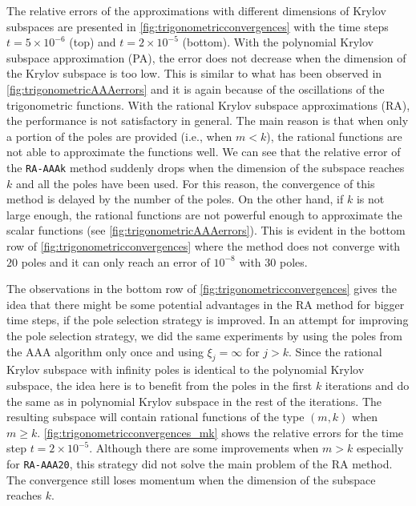 The relative errors of the approximations with different dimensions of Krylov subspaces
are presented in \autoref{fig:trigonometricconvergences} with the time steps
$t=5 \times 10^{-6}$ (top) and $t=2 \times 10^{-5}$ (bottom).
With the polynomial Krylov subspace approximation (PA), the error does not decrease when
the dimension of the Krylov subspace is too low. This is similar to what has been
observed in \autoref{fig:trigonometricAAAerrors} and it is again because of the
oscillations of the trigonometric functions.
With the rational Krylov subspace approximations (RA), the performance is not satisfactory in general.
The main reason is that when only a portion of the poles are provided (i.e., when $m < k$),
the rational functions are not able to approximate the functions well. We can see that
the relative error of the \texttt{RA-AAAk} method suddenly drops when the dimension of
the subspace reaches $k$ and all the poles have been used. For this reason, the convergence
of this method is delayed by the number of the poles. On the other hand, if $k$ is not large
enough, the rational functions are not powerful enough to approximate the scalar functions
(see \autoref{fig:trigonometricAAAerrors}).
This is evident in the bottom row of \autoref{fig:trigonometricconvergences} where the method
does not converge with $20$ poles and it can only reach an error of $10^{-8}$ with $30$ poles.

The observations in the bottom row of \autoref{fig:trigonometricconvergences} gives the
idea that there might be some potential advantages in the RA method for bigger time steps,
if the pole selection strategy is improved. In an attempt for improving the pole selection
strategy, we did the same experiments by using the poles from the AAA algorithm only once
and using $\xi_j = \infty$ for $j > k$. Since the rational Krylov subspace with infinity
poles is identical to the polynomial Krylov subspace, the idea here is to benefit from
the poles in the first $k$ iterations and do the same as in polynomial Krylov subspace
in the rest of the iterations. The resulting subspace will contain rational functions
of the type $(m, k)$ when $m \ge k$.
\autoref{fig:trigonometricconvergences_mk} shows the relative errors for the time step
$t = 2 \times 10^{-5}$. Although there are some improvements when $m > k$
especially for \texttt{RA-AAA20}, this strategy did not solve the main problem of the
RA method. The convergence still loses momentum when the dimension of the subspace
reaches $k$.

